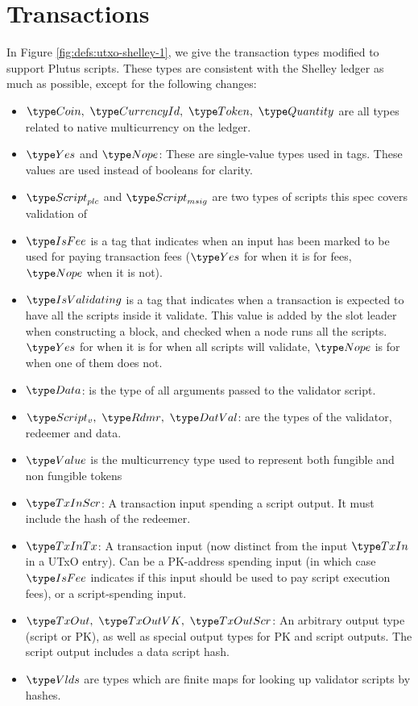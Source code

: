 \section{Transactions}
\label{sec:transactions}

In Figure \ref{fig:defs:utxo-shelley-1}, we give the transaction types modified
to support Plutus scripts. These types are consistent with the Shelley ledger
as much as possible,
except for the following changes:

\begin{itemize}
  \item $\Coin,~\CurrencyId,~\Token,~\Quantity$ are all types
  related to native multicurrency on the ledger.

  \item $\Yes$ and $\Nope$: These are single-value types used in tags. These
  values are used instead of booleans for clarity.

  \item $\ScriptPlutus$ and $\ScriptMSig$ are two types of scripts this spec
  covers validation of

  \item $\IsFee$ is a tag that indicates when an input has been marked
  to be used for paying transaction fees ($\Yes$ for when it is for fees,
  $\Nope$ when it is not).

  \item $\IsValidating$ is a tag that indicates when a transaction is
  expected to have all the scripts inside it validate.
  This value is added by the slot leader when
  constructing a block, and checked when a node runs all the scripts.
  $\Yes$ for when it is for when all scripts will validate,
  $\Nope$ is for when one of them does not.

  \item $\Data$: is the type of all arguments passed to the validator script.

  \item $\ScriptV,~ \Rdmr,~ \DatVal$: are the types of the validator,
  redeemer and data.

  \item $\Value$ is the multicurrency type used to represent
  both fungible and non fungible tokens

  \item $\TxInScr$: A transaction input spending a script output. It must
  include the hash of the redeemer.

  \item $\TxInTx$: A transaction input (now distinct from the input $\TxIn$ in
  a UTxO entry). Can be a PK-address spending input
  (in which case $\IsFee$ indicates if this input should be used to pay script execution
  fees), or a script-spending input.

  \item $\TxOut,~\TxOutVK,~\TxOutScr$: An arbitrary output type (script or PK),
  as well as special output types for PK and script outputs. The script output
  includes a data script hash.

  \item $\Vlds$ are types which are finite maps for looking up
  validator scripts by hashes.
\end{itemize}


